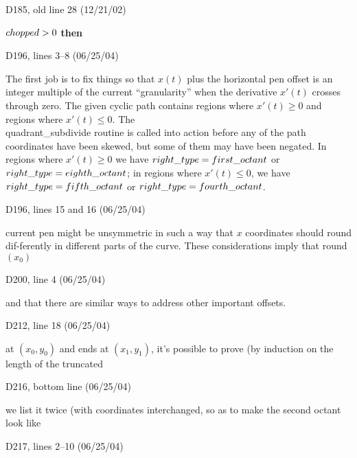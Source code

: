{{\bugonpage D185, old line 28 (12/21/02)

\ninepoint\noindent
{} $\\{chopped}>0$ {\bf then}

\bugonpage D196, lines 3--8 (06/25/04)

The first job is to fix things so that $x(t)$ plus the horizontal
pen offset is an integer multiple of the
current ``granularity'' when the derivative $x'(t)$ crosses through zero.
The given cyclic path contains regions where $x'(t)\ge0$ and regions
where $x'(t)\le0$. The \\{quadrant\_subdivide} routine is called into action
before any of the path coordinates have been skewed, but some of them
may have been negated. In regions where $x'(t)\ge0$ we have $\\{right\_type}=%
\\{first\_octant}$ or $\\{right\_type}=\\{eighth\_octant}$; in regions where
$x'(t)\le0$,
we have $\\{right\_type}=\\{fifth\_octant}$ or $\\{right\_type}=\\{fourth%
\_octant}$.

\bugonpage D196, lines 15 and 16 (06/25/04)

\noindent
current pen might be unsymmetric in such a way that $x$ coordinates
should round dif-\break ferently in different parts of the curve.
These considerations imply that round$(x_0)$\cutpar

\bugonpage D200, line 4 (06/25/04)

\noindent
and that there are similar ways to address other important offsets.\par
\smallskip{}

\bugonpage D212, line 18 (06/25/04)

\noindent
at $(x_0,y_0)$ and ends at $(x_1,y_1)$, it's possible to
prove (by induction on the length of the truncated\cutpar

\bugonpage D216, bottom line (06/25/04)

\noindent
we list it twice (with coordinates
interchanged, so as to make the second octant look like\cutpar

\bugonpage D217, lines 2--10 (06/25/04)

}}

